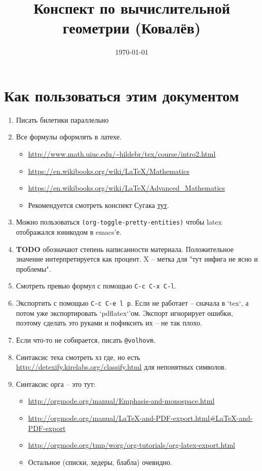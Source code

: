 \documentclass[11pt]{article}
\date{\today}
\title{Конспект по вычислительной геометрии (Ковалёв)}
\begin{document}
\maketitle
\tableofcontents


\section{Как пользоваться этим документом}
\label{sec-1}
\begin{enumerate}
\item Писать билетики параллельно
\item Все формулы оформлять в латехе.
\begin{itemize}
\item \url{http://www.math.uiuc.edu/~hildebr/tex/course/intro2.html}
\item \url{https://en.wikibooks.org/wiki/LaTeX/Mathematics}
\item \url{https://en.wikibooks.org/wiki/LaTeX/Advanced_Mathematics}
\item Рекомендуется смотреть конспект Сугака \href{https://github.com/sugakandrey/Functional-analysis/blob/master/hahnbanach.tex}{тут}.
\end{itemize}
\item Можно пользоваться \verb~(org-toggle-pretty-entities)~ чтобы latex
отображался юникодом в emacs'е.
\item \textbf{TODO} обозначают степень написанности материала. Положительное
значение интерпретируется как процент. X -- метка для "тут нифига
не ясно и проблемы".
\item Смотреть превью формул с помощью \verb~C-c C-x C-l~.
\item Экспортить с помощью \verb~C-c C-e l p~. Если не работает -- сначала в
`tex`, а потом уже экспортировать `pdflatex`'ом. Экспорт
игнорирует ошибки, поэтому сделать это руками и пофиксить их --
не так плохо.
\item Если что-то не собирается, писать \verb~@volhovm~.
\item Синтаксис теха смотреть хз где, но есть
\url{http://detexify.kirelabs.org/classify.html} для непонятных
символов.
\item Синтаксис орга -- это тут:
\begin{itemize}
\item \url{http://orgmode.org/manual/Emphasis-and-monospace.html}
\item \url{http://orgmode.org/manual/LaTeX-and-PDF-export.html#LaTeX-and-PDF-export}
\item \url{http://orgmode.org/tmp/worg/org-tutorials/org-latex-export.html}
\item Остальное (списки, хедеры, блабла) очевидно.
\end{itemize}
\end{enumerate}
\end{document}
